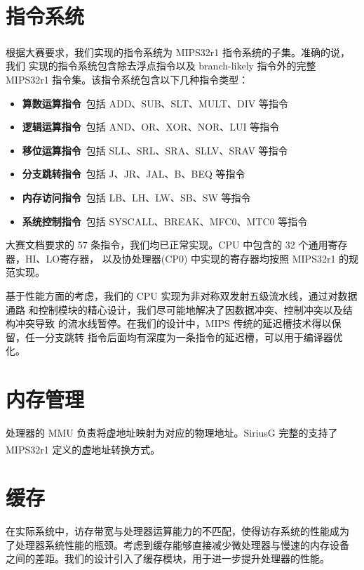 \documentclass[blue,normal,cn,hide]{elegantbook}
\begin{document}
\section{指令系统}

根据大赛要求，我们实现的指令系统为 MIPS32r1 \textsuperscript{\cite{MIPS1A}\cite{MIPS2A} 
\cite{MIPS3}} 指令系统的子集。准确的说，我们
实现的指令系统包含除去浮点指令以及 branch-likely 指令外的完整 MIPS32r1 指令集。该指令系统包含以下几种指令类型：

\begin{itemize}
    \item \textbf{算数运算指令}\ 包括 ADD、SUB、SLT、MULT、DIV 等指令
    \item \textbf{逻辑运算指令}\ 包括 AND、OR、XOR、NOR、LUI 等指令
    \item \textbf{移位运算指令}\ 包括 SLL、SRL、SRA、SLLV、SRAV 等指令
    \item \textbf{分支跳转指令}\ 包括 J、JR、JAL、B、BEQ 等指令
    \item \textbf{内存访问指令}\ 包括 LB、LH、LW、SB、SW 等指令
    \item \textbf{系统控制指令}\ 包括 SYSCALL、BREAK、MFC0、MTC0 等指令
\end{itemize}

大赛文档要求的 57 条指令，我们均已正常实现。CPU 中包含的 32 个通用寄存器，HI、LO寄存器，
以及协处理器(CP0) 中实现的寄存器均按照 MIPS32r1 的规范实现。

基于性能方面的考虑，我们的 CPU 实现为非对称双发射五级流水线，通过对数据通路
和控制模块的精心设计，我们尽可能地解决了因数据冲突、控制冲突以及结构冲突导致
的流水线暂停。在我们的设计中，MIPS 传统的延迟槽技术得以保留，任一分支跳转
指令后面均有深度为一条指令的延迟槽，可以用于编译器优化。

\section{内存管理}

处理器的 MMU 负责将虚地址映射为对应的物理地址。SiriusG 完整的支持了
MIPS32r1 \textsuperscript{\cite{MIPS3}} 定义的虚地址转换方式。

\section{缓存}

在实际系统中，访存带宽与处理器运算能力的不匹配，使得访存系统的性能成为
了处理器系统性能的瓶颈。考虑到缓存能够直接减少微处理器与慢速的内存设备
之间的差距。我们的设计引入了缓存模块，用于进一步提升处理器的性能。
\end{document}
